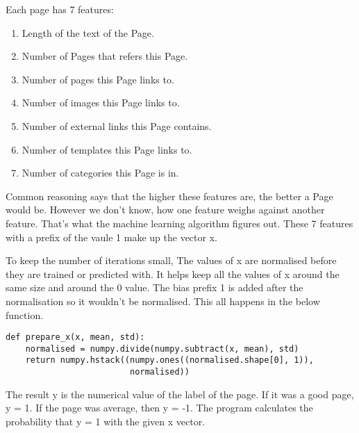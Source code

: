 Each page has 7 features:
\begin{enumerate}
  \item Length of the text of the Page.
  \item Number of Pages that refers this Page.
  \item Number of pages this Page links to.
  \item Number of images this Page links to.
  \item Number of external links this Page contains.  
  \item Number of templates this Page links to.
  \item Number of categories this Page is in.
\end{enumerate}
Common reasoning says that the higher these features are, the better a Page
would be. However we don't know, how one feature weighs against another
feature. That's what the machine learning algorithm figures out. These 7
features with a prefix of the vaule 1 make up the vector x.

To keep the number of iterations small, The values of x are normalised before
they are trained or predicted with. It helps keep all the values of x around the
same size and around the 0 value. The bias prefix 1 is added after the
normalisation so it wouldn't be normalised. This all happens in the
below function.
\begin{verbatim}
def prepare_x(x, mean, std):
    normalised = numpy.divide(numpy.subtract(x, mean), std)
    return numpy.hstack((numpy.ones((normalised.shape[0], 1)),
                         normalised))
\end{verbatim}

The result y is the numerical value of the label of the page. If it was a good
page, y = 1. If the page was average, then y = -1. The program calculates
the probability that y = 1 with the given x vector.

